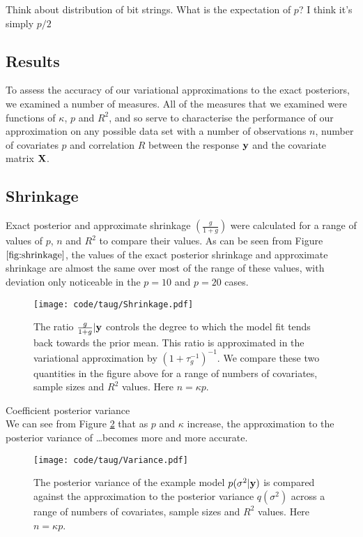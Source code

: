 \documentclass{amsart}[12pt]
\newcommand{\mgc}[1]{{\color{blue}#1}}
\begin{document}
\mgc{Think about distribution of bit strings. What is the expectation of $p$? I think it's simply $p/2$}

\subsection{Results}

To assess the accuracy of our variational approximations to the exact posteriors, we examined a number of
measures. All of the measures that we examined were functions of $\kappa$, $p$ and $R^2$, and so serve to
characterise the performance of our approximation on any possible data set with a number of observations
$n$, number of covariates $p$ and correlation $R$ between the response ${\bf y}$ and the covariate matrix ${\bf X}$.

\subsection{Shrinkage}

Exact posterior and approximate shrinkage $\left( \frac{g}{1 + g} \right)$ were calculated for a range of
values of $p$, $n$ and $R^2$ to compare their values. As can be seen from Figure $\ref{fig:shrinkage}$, the
values of the exact posterior shrinkage and approximate shrinkage are almost the same over most of the range
of these values, with deviation only noticeable in the $p=10$ and $p=20$ cases.

\begin{figure}[p]
	\texttt{[image: code/taug/Shrinkage.pdf]}
	\caption{The ratio $\frac{g}{1 + g} | {\bf y}$ controls the degree to which the model fit tends back towards
		the prior mean. This ratio is approximated in the variational approximation by $(1 + \tau_g^{-1})^{-1}$. We
		compare these two quantities in the figure above for a range of numbers of covariates, sample sizes and $R^2$
		values. Here $n = \kappa p$.}
	\label{fig:shrinkage}
\end{figure}

Coefficient posterior variance \\

We can see from Figure \ref{fig:variance} that as $p$ and $\kappa$ increase, the approximation to the
posterior variance of \ldots becomes more and more accurate.

\begin{figure}[p]
	\texttt{[image: code/taug/Variance.pdf]}
	\caption{The posterior variance of the example model $p(\sigma^2 | {\bf y})$ is compared against the approximation
		to the posterior variance $q(\sigma^2)$ across a range of numbers of covariates, sample sizes and $R^2$
	values. Here $n = \kappa p$.}
	\label{fig:variance}
\end{figure}
\end{document}
